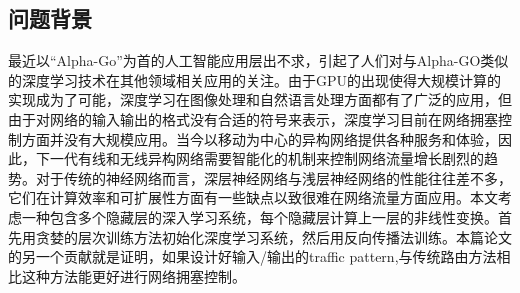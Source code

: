 \documentclass[a4paper, 11pt]{article}
\begin{document}
\begin{CJK*}{UTF8}{gbsn}

\section{问题背景}
最近以``Alpha-Go''为首的人工智能应用层出不求，引起了人们对与Alpha-GO类似的深度学习技术在其他领域相关应用的关注。由于GPU的出现使得大规模计算的实现成为了可能，深度学习在图像处理和自然语言处理方面都有了广泛的应用，但由于对网络的输入输出的格式没有合适的符号来表示，深度学习目前在网络拥塞控制方面并没有大规模应用。当今以移动为中心的异构网络提供各种服务和体验，因此，下一代有线和无线异构网络需要智能化的机制来控制网络流量增长剧烈的趋势。对于传统的神经网络而言，深层神经网络与浅层神经网络的性能往往差不多，它们在计算效率和可扩展性方面有一些缺点以致很难在网络流量方面应用。本文考虑一种包含多个隐藏层的深入学习系统，每个隐藏层计算上一层的非线性变换。首先用贪婪的层次训练方法初始化深度学习系统，然后用反向传播法训练。本篇论文的另一个贡献就是证明，如果设计好输入/输出的traffic pattern,与传统路由方法相比这种方法能更好进行网络拥塞控制。


\end{CJK*}
\end{document}

